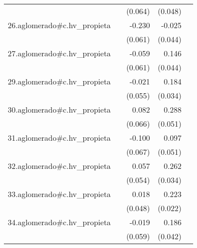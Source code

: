 {\begin{longtable}{l*{4}{D{.}{.}{-1}}}
            &                     &     (0.064)         &     (0.048)         &                     \\
\addlinespace
26.aglomerado#c.hv\_propieta&                     &      -0.230\sym{***}&      -0.025         &                     \\
            &                     &     (0.061)         &     (0.044)         &                     \\
\addlinespace
27.aglomerado#c.hv\_propieta&                     &      -0.059         &       0.146\sym{***}&                     \\
            &                     &     (0.061)         &     (0.044)         &                     \\
\addlinespace
29.aglomerado#c.hv\_propieta&                     &      -0.021         &       0.184\sym{***}&                     \\
            &                     &     (0.055)         &     (0.034)         &                     \\
\addlinespace
30.aglomerado#c.hv\_propieta&                     &       0.082         &       0.288\sym{***}&                     \\
            &                     &     (0.066)         &     (0.051)         &                     \\
\addlinespace
31.aglomerado#c.hv\_propieta&                     &      -0.100         &       0.097         &                     \\
            &                     &     (0.067)         &     (0.051)         &                     \\
\addlinespace
32.aglomerado#c.hv\_propieta&                     &       0.057         &       0.262\sym{***}&                     \\
            &                     &     (0.054)         &     (0.034)         &                     \\
\addlinespace
33.aglomerado#c.hv\_propieta&                     &       0.018         &       0.223\sym{***}&                     \\
            &                     &     (0.048)         &     (0.022)         &                     \\
\addlinespace
34.aglomerado#c.hv\_propieta&                     &      -0.019         &       0.186\sym{***}&                     \\
            &                     &     (0.059)         &     (0.042)         &                     \\

\end{longtable}}
